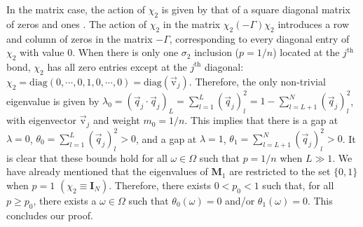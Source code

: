 \documentclass[english,12pt,jmp,graphicx]{revtex4-1}
\begin{document}
In the matrix case, the action of $\chi_2$ is given by that of a square
diagonal matrix of zeros and ones \cite{Golden:JoB:337}. The action
of $\chi_2$ in the matrix $\chi_2(-\Gamma)\chi_2$ introduces a row and column
of zeros in the matrix $-\Gamma$, corresponding to every diagonal entry of
$\chi_2$ with value 0. When there is only one $\sigma_2$ inclusion ($p=1/n$)
located at the $j^{\text{th}}$ bond, $\chi_2$ has all zero entries except
at the $j^{\text{th}}$ diagonal:
$\chi_2=\text{diag}(0,\cdots,0,1,0,\cdots,0)=\text{diag}(\vec{\text{v}}_j)$. Therefore, 
the only non-trivial eigenvalue is given by 
$\lambda_0=(\vec{q}_j\cdot\vec{q}_j)_L=\sum_{l=1}^L(\vec{q}_j)_l^2=1-\sum_{l=L+1}^N(\vec{q}_j)_l^2$, 
with eigenvector $\vec{\text{v}}_j$ and weight $m_0=1/n$. This  
implies that there is a gap at $\lambda=0$, $\theta_0=\sum_{l=1}^L(\vec{q}_j)_l^2>0$,
and a gap at $\lambda=1$, $\theta_1=\sum_{l=L+1}^N(\vec{q}_j)_l^2>0$. It is clear
that these bounds hold for all $\omega\in\Omega$ such that $p=1/n$ when $L\gg1$. We
have already mentioned that the eigenvalues of $\mathbf{M}_1$ are
restricted to the set $\{0,1\}$ when $p=1$
$(\chi_2\equiv\mathbf{I}_N)$. Therefore, there exists $0<p_0<1$ such that,
for all $p\geq p_0$, there exists a $\omega\in\Omega$ such that $\theta_0(\omega)=0$ and/or
$\theta_1(\omega)=0$. This concludes our proof.


%
%
\end{document}
